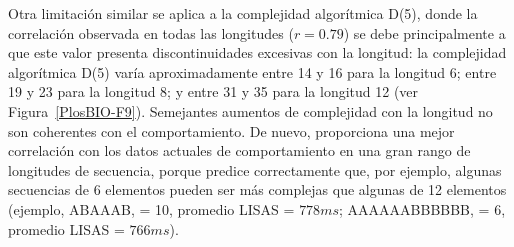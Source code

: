 Otra limitación similar se aplica a la complejidad algorítmica D(5), donde la correlación observada en todas las longitudes ($r = 0.79$) se debe principalmente a que este valor presenta discontinuidades excesivas con la longitud: la complejidad algorítmica D(5) varía aproximadamente entre 14 y 16 para la longitud 6; entre 19 y 23 para la longitud 8; y entre 31 y 35 para la longitud 12 (ver Figura~\ref{PlosBIO-F9}). Semejantes aumentos de complejidad con la longitud no son coherentes con el comportamiento. De nuevo, \mdlbin proporciona una mejor correlación con los datos actuales de comportamiento en una gran rango de longitudes de secuencia, porque predice correctamente que, por ejemplo, algunas secuencias de 6 elementos pueden ser más complejas que algunas de 12 elementos (ejemplo, ABAAAB, \mdlbin = 10, promedio LISAS = $778ms$; AAAAAABBBBBB, \mdlbin = 6, promedio LISAS = $766ms$).

